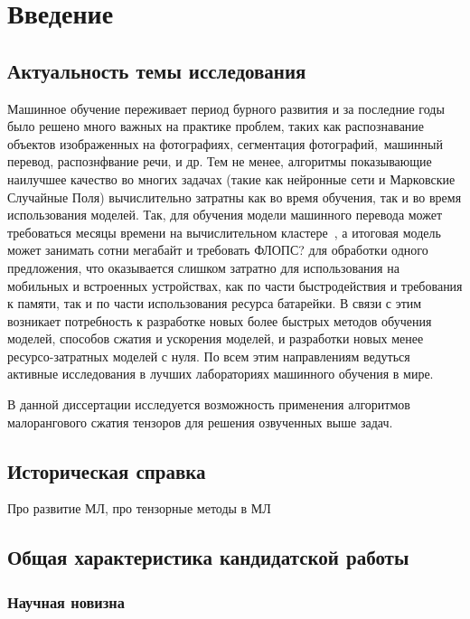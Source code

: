 \chapter*{Введение}							%

\section{Актуальность темы исследования} \label{sec:intro-importance}
Машинное обучение переживает период бурного развития и за последние годы было решено много важных на практике проблем, таких как распознавание объектов изображенных на фотографиях, сегментация фотографий, машинный перевод, распознфвание речи, и др. Тем не менее, алгоритмы показывающие наилучшее качество во многих задачах (такие как нейронные сети и Марковские Случайные Поля) вычислительно затратны как во время обучения, так и во время использования моделей. Так, для обучения модели машинного перевода может требоваться месяцы времени на вычислительном кластере~\cite{}, а итоговая модель может занимать сотни мегабайт и требовать \alert{ФЛОПС?} для обработки одного предложения, что оказывается слишком затратно для использования на мобильных и встроенных устройствах, как по части быстродействия и требования к памяти, так и по части использования ресурса батарейки. В связи с этим возникает потребность к разработке новых более быстрых методов обучения моделей, способов сжатия и ускорения моделей, и разработки новых менее ресурсо-затратных моделей с нуля. По всем этим направлениям ведуться активные исследования в лучших лабораториях машинного обучения в мире.

В данной диссертации исследуется возможность применения алгоритмов малорангового сжатия тензоров для решения озвученных выше задач. 
\section{Историческая справка} \label{sec:intro-history}
Про развитие МЛ, про тензорные методы в МЛ
\section{Общая характеристика кандидатской работы} \label{sec:intro-overview}
\subsection{Научная новизна} \label{sec:intro-novelity}

